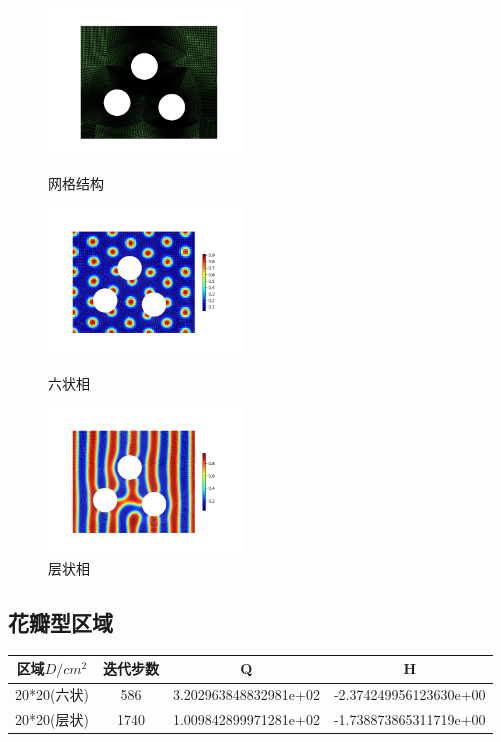 \documentclass[12pt]{article}
\begin{document}
\begin{CJK}{UTF8}{gkai}
\begin{figure}[H]
 \setlength{\abovecaptionskip}{0.cm}
 \setlength{\belowcaptionskip}{-0.cm}
 \begin{minipage}[!htbp]{0.3\linewidth}
 	\includegraphics[width=5.2cm]{Figure_11.png}
 	\caption*{网格结构}
 \end{minipage}
 \hspace{0.23in}
 \begin{minipage}[!htbp]{0.3\linewidth}
 	\includegraphics[width=5.2cm]{scftfigure640.png}
 	\caption*{六状相}
 \end{minipage}
 	\hspace{0.23in}
 	\begin{minipage}[!htbp]{0.3\linewidth}
 		\includegraphics[width=5.2cm]{scftfigure.png}
 		\caption*{层状相}
 	\end{minipage}
 \end{figure}     

\subsection{花瓣型区域}   
      \begin{table}[H]
      		\centering
      	\begin{tabular}{cccc}
      		\toprule
      		区域$D/cm^2$ &	迭代步数 & Q &  H \\
      		\midrule
      		20*20(六状)&586& 3.202963848832981e+02 & -2.374249956123630e+00\\
      		20*20(层状)&1740 &1.009842899971281e+02 & -1.738873865311719e+00\\
      		\bottomrule
      	\end{tabular}
      \end{table}
      

\end{CJK}
\end{document}
